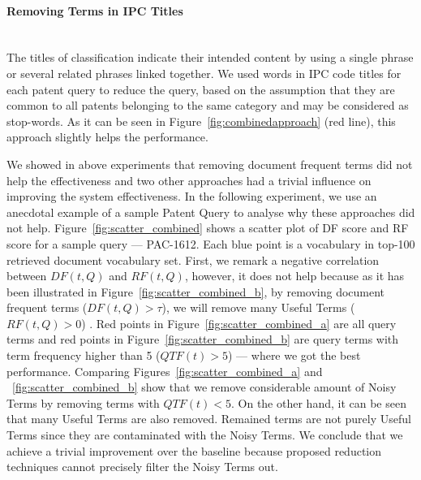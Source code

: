 \paragraph{Removing Terms in IPC Titles}
\ \\
The titles of classification indicate their intended content by using a single phrase or several related phrases linked together. We used words in IPC code titles for each patent query to reduce the query, based on the assumption that they are common to all patents belonging to the same category and may be considered as stop-words. As it can be seen in Figure~\ref{fig:combinedapproach} (red line), this approach slightly helps the performance.

We showed in above experiments that removing document frequent terms did not help the effectiveness and 
two other approaches had a trivial influence on improving the system effectiveness. 
In the following experiment, we use an anecdotal example of a sample Patent Query to analyse why these approaches did not help. 
Figure~\ref{fig:scatter_combined} shows a scatter plot of DF score and RF score for a sample query --- PAC-1612. Each blue point is a vocabulary in top-100 retrieved document vocabulary set. First, we remark a negative correlation between $\mathit{DF(t, Q)}$ and $\mathit{RF(t, Q)}$, however, it does not help because as it has been illustrated in Figure~\ref{fig:scatter_combined_b}, by removing document frequent terms ($DF(t, Q)>\tau$), we will remove many Useful Terms ($RF(t, Q)>0$) . Red points in Figure~\ref{fig:scatter_combined_a} are all query terms and red points in Figure~\ref{fig:scatter_combined_b} are query terms with term frequency higher than 5 ($QTF(t)>5$) --- where we got the best performance. 
Comparing Figures~\ref{fig:scatter_combined_a} and ~\ref{fig:scatter_combined_b} show that we remove considerable amount of Noisy Terms by removing terms with $QTF(t)<5$. 
On the other hand, it can be seen that many Useful Terms are also removed. Remained terms are not purely Useful Terms since they are contaminated with the Noisy Terms. We conclude that we achieve a trivial improvement over the baseline because proposed reduction techniques cannot precisely filter the Noisy Terms out. 
